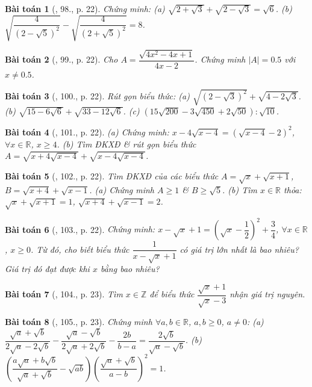 \documentclass{article}
\newtheorem{baitoan}{Bài toán}
\begin{document}
\begin{baitoan}[\cite{SBT_Toan_9_tap_1}, 98., p. 22]
	Chứng minh: (a) $\sqrt{2 + \sqrt{3}} + \sqrt{2 - \sqrt{3}} = \sqrt{6}$. (b) $\sqrt{\dfrac{4}{(2 - \sqrt{5})^2}} - \sqrt{\dfrac{4}{(2 + \sqrt{5})^2}} = 8$.
\end{baitoan}

\begin{baitoan}[\cite{SBT_Toan_9_tap_1}, 99., p. 22]
	Cho $A = \dfrac{\sqrt{4x^2 - 4x + 1}}{4x - 2}$. Chứng minh $|A| = 0.5$ với $x\ne0.5$.
\end{baitoan}

\begin{baitoan}[\cite{SBT_Toan_9_tap_1}, 100., p. 22]
	Rút gọn biểu thức: (a) $\sqrt{(2 - \sqrt{3})^2} + \sqrt{4 - 2\sqrt{3}}$. (b) $\sqrt{15 - 6\sqrt{6}} + \sqrt{33 - 12\sqrt{6}}$. (c) $(15\sqrt{200} - 3\sqrt{450} + 2\sqrt{50}):\sqrt{10}$.
\end{baitoan}

\begin{baitoan}[\cite{SBT_Toan_9_tap_1}, 101., p. 22]
	(a) Chứng minh: $x - 4\sqrt{x - 4} = (\sqrt{x - 4} - 2)^2$, $\forall x\in\mathbb{R}$, $x\ge4$. (b) Tìm ĐKXĐ \& rút gọn biểu thức $A = \sqrt{x + 4\sqrt{x - 4}} + \sqrt{x - 4\sqrt{x - 4}}$.
\end{baitoan}

\begin{baitoan}[\cite{SBT_Toan_9_tap_1}, 102., p. 22]
	Tìm ĐKXĐ của các biểu thức $A = \sqrt{x} + \sqrt{x + 1}$, $B = \sqrt{x + 4} + \sqrt{x - 1}$. (a) Chứng minh $A\ge1$ \& $B\ge\sqrt{5}$. (b) Tìm $x\in\mathbb{R}$ thỏa: $\sqrt{x} + \sqrt{x + 1} = 1$, $\sqrt{x + 4} + \sqrt{x - 1} = 2$.
\end{baitoan}

\begin{baitoan}[\cite{SBT_Toan_9_tap_1}, 103., p. 22]
	Chứng minh: $x - \sqrt{x} + 1 = \left(\sqrt{x} - \dfrac{1}{2}\right)^2 + \dfrac{3}{4}$, $\forall x\in\mathbb{R}$, $x\ge0$. Từ đó, cho biết biểu thức $\dfrac{1}{x - \sqrt{x} + 1}$ có giá trị lớn nhất là bao nhiêu? Giá trị đó đạt được khi $x$ bằng bao nhiêu?
\end{baitoan}

\begin{baitoan}[\cite{SBT_Toan_9_tap_1}, 104., p. 23]
	Tìm $x\in\mathbb{Z}$ để biểu thức $\dfrac{\sqrt{x} + 1}{\sqrt{x} - 3}$ nhận giá trị nguyên.
\end{baitoan}

\begin{baitoan}[\cite{SBT_Toan_9_tap_1}, 105., p. 23]
	Chứng minh $\forall a,b\in\mathbb{R}$, $a,b\ge0$, $a\ne0$: (a) $\dfrac{\sqrt{a} + \sqrt{b}}{2\sqrt{a} - 2\sqrt{b}} - \dfrac{\sqrt{a} - \sqrt{b}}{2\sqrt{a} + 2\sqrt{b}} - \dfrac{2b}{b - a} = \dfrac{2\sqrt{b}}{\sqrt{a} - \sqrt{b}}$. (b) $\left(\dfrac{a\sqrt{a} + b\sqrt{b}}{\sqrt{a} + \sqrt{b}} - \sqrt{ab}\right)\left(\dfrac{\sqrt{a} + \sqrt{b}}{a - b}\right)^2 = 1$.
\end{baitoan}
\end{document}
